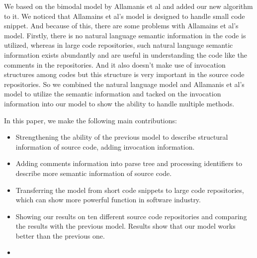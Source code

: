 We based on the bimodal model by Allamanis et al\cite{allamanis2015bimodal} and added our new algorithm to it.
We noticed that Allamains et al's model is designed to handle small code snippet. And because of this, there are some problems with Allamains et al's model. Firstly, there is no natural language semantic information in the code is utilized, whereas in large code repositories, such natural language semantic information exists abundantly and are useful in understanding the code like the comments in the repositories. And it also doesn't make use of invocation structures among codes but this structure is very important in the source code repositories.
So we combined the natural language model and Allamanis et al's model to utilize the semantic information and tacked on the invocation information into our model to show the ability to handle multiple methods.

In this paper, we make the following main contributions:
\begin{itemize}
\item Strengthening the ability of the previous model to describe structural information of source code, adding invocation information.
\item Adding comments information into parse tree and processing identifiers to describe more semantic information of source code.
\item Transferring the model from short code snippets to large code repositories, which can show more powerful
function in software industry.
\item Showing our results on ten different source code repositories and comparing the results with the
previous model. %
Results show that our model works better than the previous one.
\item {}
\end{itemize}
